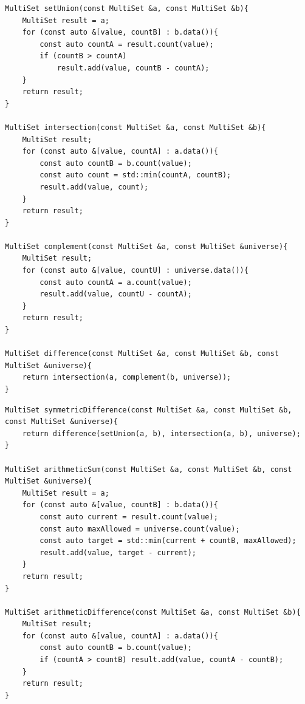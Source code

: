 \documentclass[14pt,a4paper]{extreport}
\begin{document}
\begin{listing}[H]
\caption{Реализация операций над мультимножествами (operations.cpp)}\label{lst:ops}
\begin{lstlisting}
MultiSet setUnion(const MultiSet &a, const MultiSet &b){
    MultiSet result = a;
    for (const auto &[value, countB] : b.data()){
        const auto countA = result.count(value);
        if (countB > countA)
            result.add(value, countB - countA);
    }
    return result;
}

MultiSet intersection(const MultiSet &a, const MultiSet &b){
    MultiSet result;
    for (const auto &[value, countA] : a.data()){
        const auto countB = b.count(value);
        const auto count = std::min(countA, countB);
        result.add(value, count);
    }
    return result;
}

MultiSet complement(const MultiSet &a, const MultiSet &universe){
    MultiSet result;
    for (const auto &[value, countU] : universe.data()){
        const auto countA = a.count(value);
        result.add(value, countU - countA);
    }
    return result;
}

MultiSet difference(const MultiSet &a, const MultiSet &b, const MultiSet &universe){
    return intersection(a, complement(b, universe));
}
\end{lstlisting}
\end{listing}

\begin{listing}[H]
\begin{lstlisting}
MultiSet symmetricDifference(const MultiSet &a, const MultiSet &b, const MultiSet &universe){
    return difference(setUnion(a, b), intersection(a, b), universe);
}

MultiSet arithmeticSum(const MultiSet &a, const MultiSet &b, const MultiSet &universe){
    MultiSet result = a;
    for (const auto &[value, countB] : b.data()){
        const auto current = result.count(value);
        const auto maxAllowed = universe.count(value);
        const auto target = std::min(current + countB, maxAllowed);
        result.add(value, target - current);
    }
    return result;
}

MultiSet arithmeticDifference(const MultiSet &a, const MultiSet &b){
    MultiSet result;
    for (const auto &[value, countA] : a.data()){
        const auto countB = b.count(value);
        if (countA > countB) result.add(value, countA - countB);
    }
    return result;
}
\end{lstlisting}
\end{listing}
\end{document}
